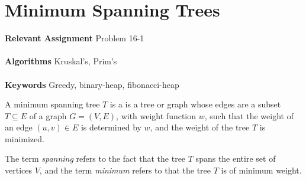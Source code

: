 
\chapter{Minimum Spanning Trees}
\label{ch:minimumspanningtrees}

\textbf{Relevant Assignment} Problem 16-1\\\\
\textbf{Algorithms} Kruskal's, Prim's\\\\
\textbf{Keywords} Greedy, binary-heap, fibonacci-heap
\vspace{1in}

\noindent A minimum spanning tree $T$ is a is a tree or graph whose edges are
a subset $T \subseteq E$ of a graph $G = (V, E)$, with weight function $w$,
such that the weight of an edge $(u, v) \in E$ is determined by $w$, and the
weight of the tree $T$ is minimized.

The term \textit{spanning} refers to the fact that the tree $T$ spans the
entire set of vertices $V$, and the term \textit{minimum} refers to that the
tree $T$ is of minimum weight.

